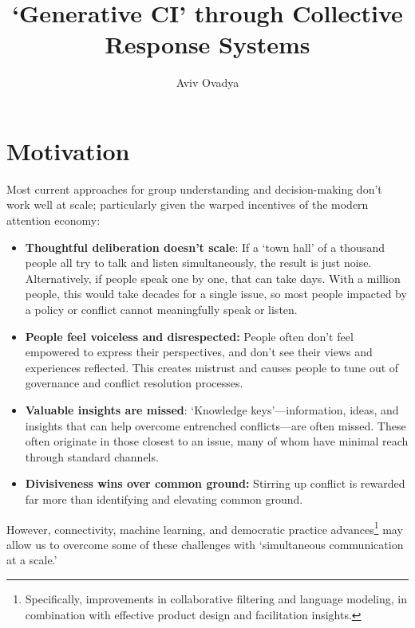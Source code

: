 \documentclass[sigconf,authorversion,nonacm,linkcolor=blue,colorlinks]{acmart}
\title{`Generative CI' through Collective Response Systems%
}
\author{Aviv Ovadya}
\affiliation{Technology and Public Purpose Fellow, Belfer Center, Harvard Kennedy School \country{USA}}
\affiliation{Visiting Scholar, Leverhulme Centre for the Future of Intelligence, University of Cambridge \country{UK}}
\begin{document}
\maketitle



\hypertarget{motivation}{%
\section{Motivation}\label{motivation}}

Most current approaches for group understanding and decision-making don't work well at scale; particularly given the warped incentives of the modern attention economy: 

\begin{itemize}
\item
  \textbf{Thoughtful deliberation doesn't scale}: If a `town hall' of a thousand people all try to talk and listen simultaneously, the result is just noise. Alternatively, if people speak one by one, that can take days. With a million people, this would take decades for a single issue, so most people impacted by a policy or conflict cannot meaningfully speak or listen.
\item
  \textbf{People feel voiceless and disrespected:} People often don't feel empowered to express their perspectives, and don't see their views and experiences reflected. This creates mistrust and causes people to tune out of governance and conflict resolution processes.
\item
  \textbf{Valuable insights are missed}: `Knowledge keys'---information, ideas, and insights that can help overcome entrenched conflicts---are often missed. These often originate in those closest to an issue, many of whom have minimal reach through standard channels.
\item
  \textbf{Divisiveness wins over common ground:} Stirring up conflict is rewarded far more than identifying and elevating common ground.
\end{itemize}

However, connectivity, machine learning, and democratic practice advances\footnote{Specifically, improvements in collaborative filtering and language modeling, in combination with effective product design and facilitation insights.} may allow us to overcome some of these challenges with `simultaneous communication at a scale.'
\end{document}
